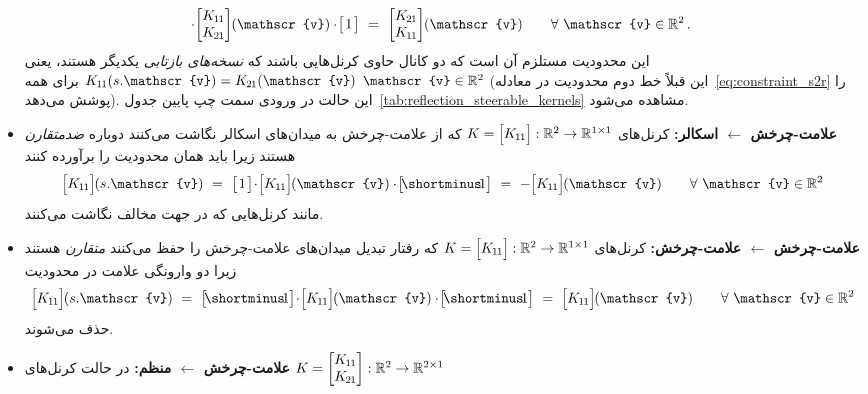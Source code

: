 \begin{itemize}
\begin{align}
		\!\cdot\!
		\begin{bmatrix} \Koo \\ \Kto \end{bmatrix} \mkern-4mu (\mathscr{v})
		\cdot\!
		\big[\mkern2mu 1 \mkern2mu\big]
		\ =\ 
		\begin{bmatrix} \Kto \\ \Koo \end{bmatrix} \mkern-4mu (\mathscr{v})
		\qquad \forall\ \mathscr{v} \in \R^2 \,.
	\end{align}
	این محدودیت مستلزم آن است که دو کانال حاوی کرنل‌هایی باشند که \emph{نسخه‌های بازتابی} یکدیگر هستند، یعنی
	$\Koo(s.\mathscr{v}) = \Kto(\mathscr{v})$ برای همه $\mathscr{v} \in \R^2$
	(این قبلاً خط دوم محدودیت در معادله~\eqref{eq:constraint_s2r} را پوشش می‌دهد).
	این حالت در ورودی سمت چپ پایین جدول~\ref{tab:reflection_steerable_kernels} مشاهده می‌شود.
	\item[{\rule[2.0pt]{2pt}{2pt}}]
	\textbf{علامت-چرخش $\leftarrow$ اسکالر:}
	کرنل‌های
	$K = \pig[\Koo\pig]: \R^2 \to \R^{1\times1}$
	که از علامت-چرخش به میدان‌های اسکالر نگاشت می‌کنند دوباره \emph{ضدمتقارن} هستند زیرا باید همان محدودیت را برآورده کنند
	\begin{align}
		\pig[\Koo\pig] \mkern-1mu (s.\mathscr{v})
		\ =\ 
		\big[\mkern2mu 1 \mkern2mu\big]
		\!\cdot\!
		\pig[\Koo\pig] \mkern-1mu (\mathscr{v})
		\cdot\!
		\big[\! \shortminus\!1 \big]
		\ =\ 
		-\pig[\Koo\pig] \mkern-1mu (\mathscr{v})
		\qquad \forall\ \mathscr{v} \in \R^2
	\end{align}
	مانند کرنل‌هایی که در جهت مخالف نگاشت می‌کنند.
	\item[{\rule[2.0pt]{2pt}{2pt}}]
	\textbf{علامت-چرخش $\leftarrow$ علامت-چرخش:}
	کرنل‌های
	$K = \pig[\Koo\pig]: \R^2 \to \R^{1\times1}$
	که رفتار تبدیل میدان‌های علامت-چرخش را حفظ می‌کنند \emph{متقارن} هستند زیرا دو وارونگی علامت در محدودیت
	\begin{align}
		\pig[\Koo\pig] \mkern-1mu (s.\mathscr{v})
		\ =\ 
		\big[\! \shortminus\!1 \big]
		\!\cdot\!
		\pig[\Koo\pig] \mkern-1mu (\mathscr{v})
		\cdot\!
		\big[\! \shortminus\!1 \big]
		\ =\ 
		\pig[\Koo\pig] \mkern-1mu (\mathscr{v})
		\qquad \forall\ \mathscr{v} \in \R^2
	\end{align}
	حذف می‌شوند.
	\item[{\rule[2.0pt]{2pt}{2pt}}]
	\textbf{علامت-چرخش $\leftarrow$ منظم:}
	در حالت کرنل‌های
	$K = \begin{bmatrix} K_{\mkern-1mu 1 \mkern-1mu 1} \\ K_{\mkern-1mu 2 \mkern-1mu 1} \end{bmatrix}: \mathbb{R}^2 \to \mathbb{R}^{2\times1}$

\end{itemize}
